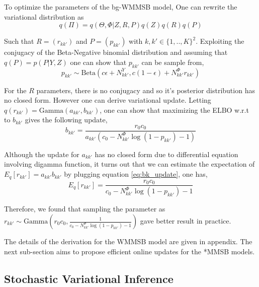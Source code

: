 To optimize the parameters of the bg-WMMSB model, One can rewrite the variational distribution as
\begin{equation*}
q(\Pi) = q(\Theta, \Phi|Z, R, P) q(Z)q(R)q(P)
\end{equation*}

Such that $R=(r_{kk'})$ and $P=(p_{kk'})$ with $k,k' \in \{1,..,K\}^2$. Exploiting the conjugacy of the Beta-Negative binomial distribution and assuming that $q(P)=p(P|Y,Z)$  one can show that $p_{kk'}$ can be sample from,
\begin{equation} \label{eq:pk_update}
p_{kk'} \sim \textrm{Beta}(c\epsilon + N^Y_{kk'}, c(1-\epsilon) + N^\Phi_{kk'}r_{kk'})
\end{equation}

For the $R$ parameters, there is no conjugacy and so it's posterior distribution has no closed form. However one can derive variational update. Letting $q(r_{kk'}) = \textrm{Gamma}(a_{kk'},b_{kk'})$, one can show that maximizing the ELBO w.r.t to $b_{kk'}$ gives the following update,
\begin{equation} \label{eq:bk_update}
b_{kk'}= \frac{r_0c_0}{a_{kk'} (c_0  -N^\Phi_{kk'}\log(1-p_{kk'}) -1)}
\end{equation}

Although the update for $a_{kk'}$ has no closed form due to differential equation involving digamma function, it turns out that we can estimate the expectation of $E_q[r_{kk'}]=a_{kk'}b_{kk'}$ by plugging equation \eqref{eq:bk_update}, one has,
\begin{equation} \label{eq:rk_update}
E_q[r_{kk'}] = \frac{r_0c_0}{c_0  -N^\Phi_{kk'}\log(1-p_{kk'}) -1}
\end{equation}

Therefore, we found  that sampling the parameter as $r_{kk'} \sim \textrm{Gamma}(r_0c_0,\frac{1}{c_0  -N^\Phi_{kk'}\log(1-p_{kk'}) -1} )$ gave better result in practice.

The details of the derivation for the WMMSB model are given in appendix.
The next sub-section aims to propose efficient online updates for the *MMSB models.

\subsection{Stochastic Variational Inference}

